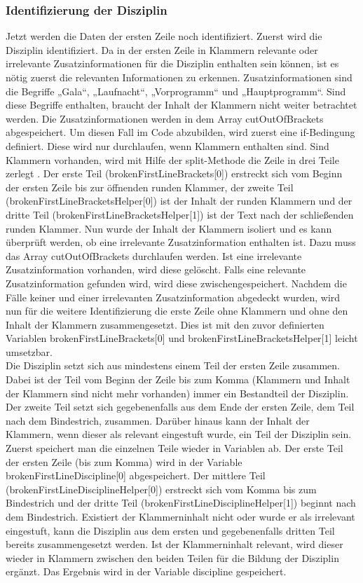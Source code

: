 \subsubsection{Identifizierung der Disziplin}
Jetzt werden die Daten der ersten Zeile noch identifiziert. Zuerst wird die Disziplin identifiziert.
Da in der ersten Zeile in Klammern relevante oder irrelevante Zusatzinformationen für die Disziplin enthalten sein können, ist es nötig zuerst die relevanten Informationen zu erkennen. Zusatzinformationen sind die Begriffe „Gala“, „Laufnacht“, „Vorprogramm“ und „Hauptprogramm“. Sind diese Begriffe enthalten, braucht der Inhalt der Klammern nicht weiter betrachtet werden. Die Zusatzinformationen werden in dem Array cutOutOfBrackets abgespeichert. Um diesen Fall im Code abzubilden, wird zuerst eine if-Bedingung definiert. Diese wird nur durchlaufen, wenn Klammern enthalten sind. Sind Klammern vorhanden, wird mit Hilfe der split-Methode die Zeile in drei Teile zerlegt \cite{split}. Der erste Teil (brokenFirstLineBrackets[0]) erstreckt sich vom Beginn der ersten Zeile bis zur öffnenden runden Klammer, der zweite Teil (brokenFirstLineBracketsHelper[0]) ist der Inhalt der runden Klammern und der dritte Teil (brokenFirstLineBracketsHelper[1]) ist der Text nach der schließenden runden Klammer. Nun wurde der Inhalt der Klammern isoliert und es kann überprüft werden, ob eine irrelevante Zusatzinformation enthalten ist. Dazu muss das Array cutOutOfBrackets durchlaufen werden. Ist eine irrelevante Zusatzinformation vorhanden, wird diese gelöscht. Falls eine relevante Zusatzinformation gefunden wird, wird diese zwischengespeichert. Nachdem die Fälle keiner und einer irrelevanten Zusatzinformation abgedeckt wurden, wird nun für die weitere Identifizierung die erste Zeile ohne Klammern und ohne den Inhalt der Klammern zusammengesetzt. Dies ist mit den zuvor definierten Variablen brokenFirstLineBrackets[0] und brokenFirstLineBracketsHelper[1] leicht umsetzbar.\\
Die Disziplin setzt sich aus mindestens einem Teil der ersten Zeile zusammen. Dabei ist der Teil vom Beginn der Zeile bis zum Komma (Klammern und Inhalt der Klammern sind nicht mehr vorhanden) immer ein Bestandteil der Disziplin. Der zweite Teil setzt sich gegebenenfalls aus dem Ende der ersten Zeile, dem Teil nach dem Bindestrich, zusammen. Darüber hinaus kann der Inhalt der Klammern, wenn dieser als relevant eingestuft wurde, ein Teil der Disziplin sein.
Zuerst speichert man die einzelnen Teile wieder in Variablen ab. Der erste Teil der ersten Zeile (bis zum Komma) wird in der Variable brokenFirstLineDiscipline[0] abgespeichert. Der mittlere Teil (brokenFirstLineDisciplineHelper[0]) erstreckt sich vom Komma bis zum Bindestrich und der dritte Teil (brokenFirstLineDisciplineHelper[1]) beginnt nach dem Bindestrich. Existiert der Klammerninhalt nicht oder wurde er als irrelevant eingestuft, kann die Disziplin aus dem ersten und gegebenenfalls dritten Teil bereits zusammengesetzt werden. Ist der Klammerninhalt relevant, wird dieser wieder in Klammern zwischen den beiden Teilen für die Bildung der Disziplin ergänzt. Das Ergebnis wird in der Variable discipline gespeichert.\\
